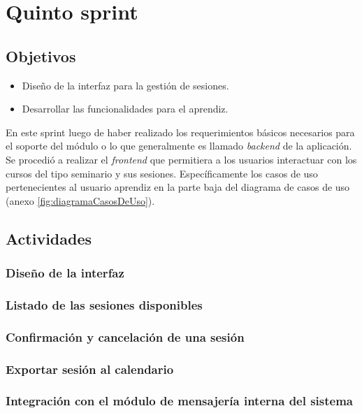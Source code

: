 ﻿\section{Quinto sprint} %
\label{sec:quinto_sprint}

\subsection{Objetivos}

\begin{itemize}
	\item Diseño de la interfaz para la gestión de sesiones.
	\item Desarrollar las funcionalidades para el aprendiz.
\end{itemize}

En este sprint luego de haber realizado los requerimientos básicos necesarios para el soporte del módulo o lo que generalmente es llamado \emph{backend} de la aplicación. Se procedió a realizar el \emph{frontend} que permitiera a los usuarios interactuar con los cursos del tipo seminario y sus sesiones. Específicamente los casos de uso pertenecientes al usuario aprendiz en la parte baja del diagrama de casos de uso (anexo \ref{fig:diagramaCasosDeUso}).

\subsection{Actividades} %
\label{sub:actividades5}

\subsubsection{Diseño de la interfaz}

\subsubsection{Listado de las sesiones disponibles}

\subsubsection{Confirmación y cancelación de una sesión}

\subsubsection{Exportar sesión al calendario}

\subsubsection{Integración con el módulo de mensajería interna del sistema}


